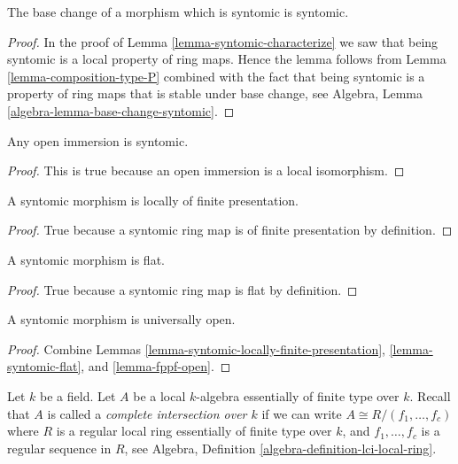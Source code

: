 \begin{lemma}
\label{lemma-base-change-syntomic}
The base change of a morphism which is syntomic is syntomic.
\end{lemma}

\begin{proof}
In the proof of Lemma \ref{lemma-syntomic-characterize}
we saw that being syntomic is a local property of ring maps.
Hence the lemma follows from
Lemma \ref{lemma-composition-type-P} combined
with the fact that being syntomic is a property of ring maps that is
stable under base change, see
Algebra, Lemma \ref{algebra-lemma-base-change-syntomic}.
\end{proof}

\begin{lemma}
\label{lemma-open-immersion-syntomic}
Any open immersion is syntomic.
\end{lemma}

\begin{proof}
This is true because an open immersion is a local isomorphism.
\end{proof}

\begin{lemma}
\label{lemma-syntomic-locally-finite-presentation}
A syntomic morphism is locally of finite presentation.
\end{lemma}

\begin{proof}
True because a syntomic ring map is of finite presentation by
definition.
\end{proof}

\begin{lemma}
\label{lemma-syntomic-flat}
A syntomic morphism is flat.
\end{lemma}

\begin{proof}
True because a syntomic ring map is flat by definition.
\end{proof}

\begin{lemma}
\label{lemma-syntomic-open}
A syntomic morphism is universally open.
\end{lemma}

\begin{proof}
Combine
Lemmas \ref{lemma-syntomic-locally-finite-presentation},
\ref{lemma-syntomic-flat}, and
\ref{lemma-fppf-open}.
\end{proof}

\noindent
Let $k$ be a field. Let $A$ be a local $k$-algebra essentially
of finite type over $k$. Recall that $A$ is called a
{\it complete intersection over $k$} if we can write
$A \cong R/(f_1, \ldots, f_c)$ where $R$ is a regular local ring
essentially of finite type over $k$, and $f_1, \ldots, f_c$ is
a regular sequence in $R$, see
Algebra, Definition \ref{algebra-definition-lci-local-ring}.

